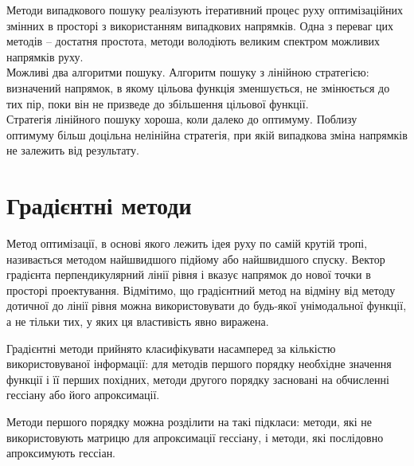 \begin{itemize}
	Методи випадкового пошуку реалізують ітеративний процес руху оптимізаційних змінних в просторі з використанням випадкових напрямків. Одна з переваг цих методів – достатня простота, методи володіють великим спектром можливих напрямків руху. \\	
	Можливі два алгоритми пошуку. Алгоритм пошуку з лінійною стратегією: визначений напрямок, в якому цільова функція зменшується, не змінюється до тих пір, поки він не призведе до збільшення цільової функції. \\	
	Стратегія лінійного пошуку хороша, коли далеко до оптимуму. Поблизу оптимуму більш доцільна нелінійна стратегія, при якій випадкова зміна напрямків не залежить від результату.
\end{itemize}

\section {Градієнтні методи}

Метод оптимізації, в основі якого лежить ідея руху по самій крутій тропі, називається методом найшвидшого підйому або найшвидшого спуску. Вектор градієнта перпендикулярний лінії рівня і вказує напрямок до нової точки в просторі проектування. Відмітимо, що градієнтний метод на відміну від методу дотичної до лінії рівня можна використовувати до будь-якої унімодальної функції, а не тільки тих, у яких ця властивість явно виражена.

Градієнтні методи прийнято класифікувати насамперед за кількістю використовуваної інформації: для методів першого порядку необхідне значення функції і її перших похідних, методи другого порядку засновані на обчисленні гессіану або його апроксимації.

Методи першого порядку можна розділити на такі підкласи: методи, які не використовують матрицю для апроксимації гессіану, і методи, які послідовно апроксимують гессіан.	




